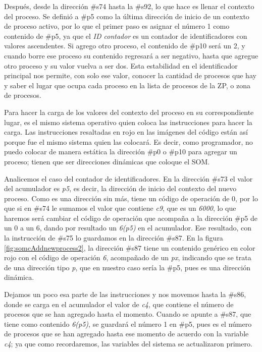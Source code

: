 \documentclass[letterpaper,12pt,oneside]{book}
\begin{document}
			
			Después, desde la dirección \#s74 hasta
			la \#s92, lo que hace es llenar el contexto del proceso. Se definió a \#p5 como la última dirección de inicio de un 
			contexto de proceso activo, por lo que el primer paso es asignar el número 1 como contenido de \#p5, ya que el \textit{ID contador} 
			es un 
			contador 
			de identificadores
			con valores ascendentes. Si agrego otro proceso, el contenido de \#p10 será un 2, y cuando borre ese proceso
			su contenido regresará a ser negativo, hasta que agregue otro proceso y su valor vuelva a ser dos. Esta estabilidad en el identificador 
			principal
			nos permite, con solo ese valor, conocer la cantidad de procesos que hay  y saber el lugar que ocupa cada proceso en la lista
			de procesos de la ZP, o zona de procesos.
			
			Para hacer la carga de los valores del contexto del proceso en su correspondiente lugar, es el mismo sistema operativo
			quien coloca las instrucciones para hacer la carga. Las instrucciones resaltadas en rojo en las imágenes del código 
			están así porque fue el mismo sistema quien las colocará. Es decir, como programador, no puedo colocar de manera estática la dirección
			\#p0 o \#p10 para agregar un proceso; tienen que ser direcciones dinámicas que coloque el SOM.
   
            Analicemos el caso del contador de identificadores. En la dirección
			\#s73 el valor del acumulador es \textit{p5}, es decir, la dirección de inicio del contexto del nuevo proceso. Como es una dirección sin 
			más,
			tiene un código de operación de 0, por lo que si en \#s74 le sumamos el valor que contiene \textit{c9}, que es un \textit{6000}, lo que 
			haremos
			será cambiar el código de operación que acompaña a la dirección \#p5 de un 0 a un 6, dando por resultado un \textit{6(p5)} en el 
			acumulador.
			Ese resultado, con la instrucción de \#s75 lo guardamos en la dirección \#s87. En la figura \ref{fig:somcAddnewprocess2}, 
			la dirección \#s87 tiene 
			un contenido genérico en color rojo con el código de operación \textit{6}, acompañado de un \textit{px}, indicando
			que se trata de una dirección tipo \textit{p}, que en nuestro caso sería la \#p5, pues es una dirección dinámica. 

			Dejamos un poco esa parte de las instrucciones y nos movemos hasta la \#s86, donde se carga
			en el acumulador el valor de \textit{c4}, que contiene el número de procesos que se han agregado hasta el momento. Cuando se apunte a \#s87,
			que tiene como contenido \textit{6(p5)}, se guardará el número 1 en \#p5, pues es el número de procesos que se han agregado hasta ese 
			momento de acuerdo con la variable \textit{c4}; ya que como recordaremos, las variables del sistema se actualizaron primero.
			
\end{document}
